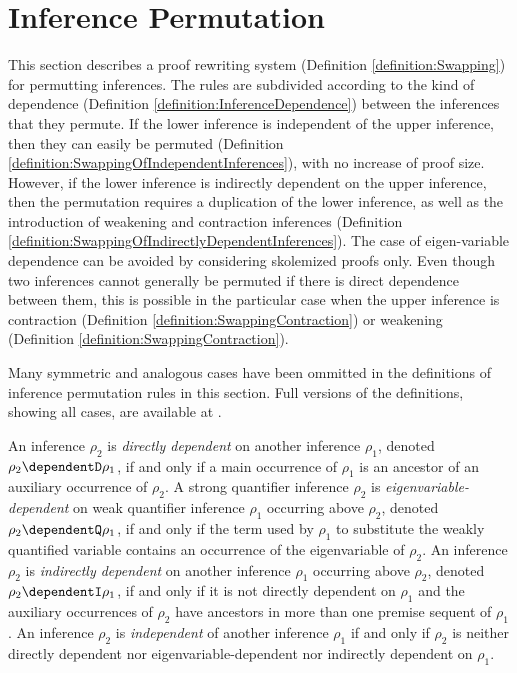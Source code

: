 \section{Inference Permutation}
\label{appendix:InferencePermutation}

This section describes a proof rewriting system 
(Definition \ref{definition:Swapping}) for permutting inferences. 
The rules are subdivided according to the kind of dependence (Definition \ref{definition:InferenceDependence}) between the inferences that they permute. 
If the lower inference is independent of the upper inference, then they can easily be permuted (Definition \ref{definition:SwappingOfIndependentInferences}), with no increase of proof size. 
However, if the lower inference is indirectly dependent on the upper inference, then the permutation requires a duplication of the lower inference, as well as the introduction of weakening and contraction inferences (Definition \ref{definition:SwappingOfIndirectlyDependentInferences}). 
The case of eigen-variable dependence can be avoided by considering skolemized proofs only. 
Even though two inferences cannot generally be permuted if there is direct dependence between them, this is possible in the particular case when the upper inference is contraction (Definition \ref{definition:SwappingContraction}) or weakening (Definition \ref{definition:SwappingContraction}). 

\begin{remark}
Many symmetric and analogous cases have been ommitted 
in the definitions of inference permutation rules in this section. 
Full versions of the definitions, showing all cases, are available at \cite{Woltzenlogel-Paleo2009A-General-Analysis-of-Cut-Elimination-by-CERes}.
\end{remark}


\begin{definition}
\label{definition:InferenceDependence}
An inference $\rho_2$ is \emph{directly dependent} on another inference $\rho_1$, denoted $\rho_2 \dependentD \rho_1$, if and only if a main occurrence of $\rho_1$ is an ancestor of an auxiliary occurrence of $\rho_2$. 
%
A strong quantifier inference $\rho_2$ is \emph{eigenvariable-dependent} on weak quantifier inference $\rho_1$ occurring above $\rho_2$, denoted $\rho_2 \dependentQ \rho_1$, if and only if the term used by $\rho_1$ to substitute the weakly quantified variable contains an occurrence of the eigenvariable of $\rho_2$.
%
An inference $\rho_2$ is \emph{indirectly dependent} on another inference $\rho_1$ occurring above $\rho_2$, denoted $\rho_2 \dependentI \rho_1$, if and only if it is not directly dependent on $\rho_1$ and the auxiliary occurrences of $\rho_2$ have ancestors in more than one premise sequent of $\rho_1$.
%
An inference $\rho_2$ is \emph{independent} of another inference $\rho_1$ if and only if $\rho_2$ is neither directly dependent nor eigenvariable-dependent nor indirectly dependent on $\rho_1$. 
\end{definition}



